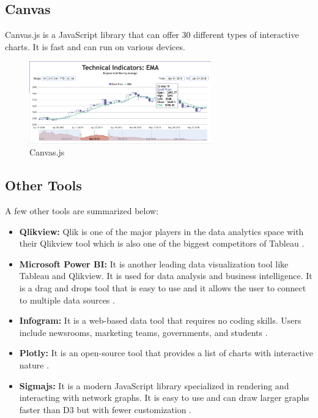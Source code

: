\subsection{Canvas}
Canvas.js is a JavaScript library that can offer 30 different types of interactive charts. It is fast and can run on various devices.
\begin{figure}[H]
\centering
\captionsetup{justification=centering}
\includegraphics[width=0.7\textwidth]{Report-latex/tex_files/pics/canvas.png}
\caption{Canvas.js \cite{canvas}}
\label{fig:canvas}
\end{figure}



\subsection{Other Tools}

A few other tools are summarized below:

\begin{itemize}
    \item \textbf{Qlikview: }Qlik is one of the major players in the data analytics space with their Qlikview tool which is also one of the biggest competitors of Tableau \cite{qlik}.
    \item \textbf{Microsoft Power BI: }It is another leading data visualization tool like Tableau and Qlikview. It is used for data analysis and business intelligence. It is a drag and drops tool that is easy to use and it allows the user to connect to multiple data sources \cite{bi}.
    \item \textbf{Infogram: }It is a web-based data tool that requires no coding skills. Users include newsrooms, marketing teams, governments, and students \cite{infogram}.
    \item \textbf{Plotly: }It is an open-source tool that provides a list of charts with interactive nature \cite{plotly}.
    \item \textbf{Sigmajs: }It is a modern JavaScript library specialized in rendering and interacting with network graphs. It is easy to use and can draw larger graphs faster than D3 but with fewer customization \cite{sigma}.
   
\end{itemize}





